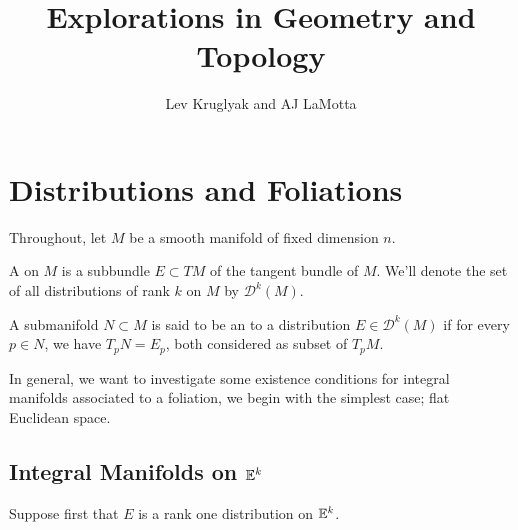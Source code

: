 \documentclass{lkx_paper}
\title{\textbf{Explorations in Geometry and Topology}}
\date{}
\author{Lev Kruglyak and AJ LaMotta}
\begin{document}
\maketitle

\section*{Distributions and Foliations}

Throughout, let $M$ be a smooth manifold of fixed dimension $n$.

\begin{definition}
  A  on $M$ is a subbundle $E\subset TM$ of the tangent bundle of $M$. We'll denote the set of all distributions of rank $k$ on $M$ by $\mathscr{D}^k(M)$.
\end{definition}

\begin{definition}
  A submanifold $N\subset M$ is said to be an  to a distribution $E\in \mathscr{D}^k(M)$ if for every $p\in N$, we have $T_p N = E_p$, both considered as subset of $T_p M$.
\end{definition}

In general, we want to investigate some existence conditions for integral manifolds associated to a foliation, we begin with the simplest case; flat Euclidean space.

\subsection*{Integral Manifolds on $\mathbb{E}^k$}

Suppose first that $E$ is a rank one distribution on $\mathbb{E}^k$.
\end{document}
